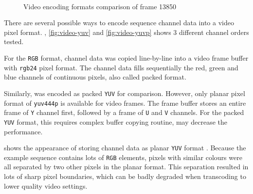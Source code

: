 \begin{figure}[t]
{  \label{fig:video-420}}\hfil
  \hfil
  \\
  \caption{\footnotesize Video encoding formats comparison of frame 13850}
  \label{fig:video-pix_fmt}
\end{figure}

There are several possible ways to encode sequence channel data into a video pixel format. , \ref{fig:video-yuv} and \ref{fig:video-yuvp} shows 3 different channel orders tested.

For the \texttt{RGB} format, channel data was copied line-by-line into a video frame buffer with \texttt{rgb24} pixel format. The channel data fills sequentially the red, green and blue channels of continuous pixels, also called packed format.

Similarly,  was encoded as packed \texttt{YUV} for comparison. However, only planar pixel format of \texttt{yuv444p} is available for video frames. The frame buffer stores an entire frame of \texttt{Y} channel first, followed by a frame of \texttt{U} and \texttt{V} channels. For the packed \texttt{YUV} format, this requires complex buffer copying routine,  may decrease the performance.

 shows the appearance of storing channel data as planar \texttt{YUV} format . Because the example sequence contains lots of \texttt{RGB} elements, pixels with similar colours were all separated by two other pixels in the planar format. This separation resulted in lots of sharp pixel boundaries, which can be badly degraded when transcoding to lower quality video settings.

